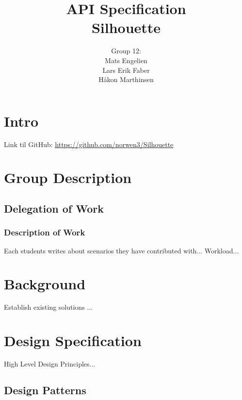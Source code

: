 \documentclass[12pt]{article}
\begin{document}
\title{%
    API Specification\\
    \large Silhouette}
\author{%
    Group 12:\\
    Mats Engelien\\
    Lars Erik Faber\\
    Håkon Marthinsen}
\date{}
\maketitle

\newpage

\tableofcontents

\newpage

\section{Intro}

Link til GitHub: \href{https://github.com/norwen3/Silhouette}{https://github.com/norwen3/Silhouette}

\section{Group Description}

\subsection{Delegation of Work}

\subsubsection{Description of Work}
Each students writes about scenarios they have contributed with...
Workload...

\section{Background}
Establish existing solutions ...

\section{Design Specification}
High Level Design Principles...

\subsection{Design Patterns}
\end{document}
